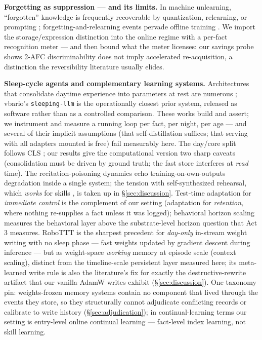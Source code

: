 \documentclass[11pt]{article}
\begin{document}
\textbf{Forgetting as suppression --- and its limits.} In machine unlearning, ``forgotten''
knowledge is frequently recoverable by quantization, relearning, or prompting
\citep{quantization-unlearning,unlearning-deletion,kotha2023}; forgetting-and-relearning events
pervade offline training \citep{toneva2019}. We import the storage/expression distinction
\citep{allenzhu2024} into the online regime with a per-fact recognition meter --- and then bound
what the meter licenses: our savings probe shows 2-AFC discriminability does not imply
accelerated re-acquisition, a distinction the reversibility literature usually elides.

\textbf{Sleep-cycle agents and complementary learning systems.} Architectures that consolidate
daytime experience into parameters at rest are numerous
\citep{lee2026offline,behrouz2026sleep,scm2026,wang2026scol,hoy2025stable,behrouz2024titans,attt2026};
vbario's \texttt{sleeping-llm} \citep{bario2026sleepingllm} is the operationally closest prior
system, released as software rather than as a controlled comparison. These works build and
assert; we instrument and measure a running loop per fact, per night, per age --- and several of
their implicit assumptions (that self-distillation suffices; that serving with all adapters
mounted is free) fail measurably here. The day/core split follows CLS \citep{mcclelland1995};
our results give the computational version two sharp caveats (consolidation must be driven by
ground truth; the fast store interferes at \emph{read} time). The recitation-poisoning dynamics
echo training-on-own-outputs degradation \citep{shumailov2024} inside a single system; the
tension with self-synthesized rehearsal, which \emph{works} for skills \citep{huang2024ssr}, is
taken up in \S\ref{sec:discussion}. Test-time adaptation for \emph{immediate control}
\citep{wang2026adajepa} is the complement of our setting (adaptation for \emph{retention}, where
nothing re-supplies a fact unless it was logged); behavioral horizon scaling
\citep{edgebench2026} measures the behavioral layer above the substrate-level horizon question
that Act 3 measures. RoboTTT \citep{robottt2026} is the sharpest precedent for \emph{day-only}
in-stream weight writing with no sleep phase --- fast weights updated by gradient descent during
inference --- but as weight-space \emph{working} memory at episode scale (context scaling),
distinct from the timeline-scale persistent layer measured here; its meta-learned write rule is
also the literature's fix for exactly the destructive-rewrite artifact that our vanilla-AdamW
writes exhibit (\S\ref{sec:discussion}). One taxonomy pin: weights-frozen memory systems contain
no component that lived through the events they store, so they structurally cannot adjudicate
conflicting records or calibrate to write history (\S\ref{sec:adjudication}); in
continual-learning terms our setting is entry-level online continual learning --- fact-level
index learning, not skill learning.
\end{document}
